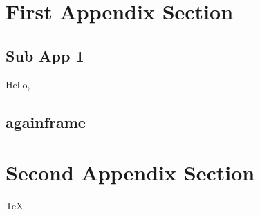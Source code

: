 \appendix



\section*{}

\begin{frame}{\secname}
    \tableofcontents[hideallsubsections,firstsection=3]
\end{frame}

\section[1st App Sec]{First Appendix Section}
\subsection{Sub App 1}

\begin{frame}{\subsecname}
    \alert{Hello,} 
\end{frame}

\subsection{againframe}

\section[2nd App Sec]{Second Appendix Section}
\begin{frame}{\secname}
    \TeX
\end{frame}

